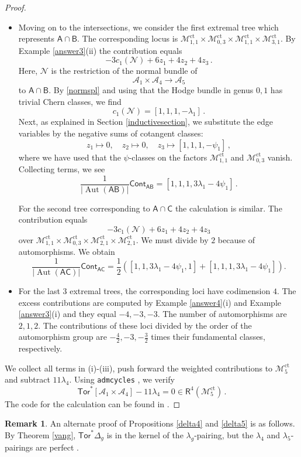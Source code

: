 \documentclass[11pt]{amsart}
\theoremstyle{definition}
\newtheorem{rem}[thm]{Remark}
\newcommand{\M}{\mathcal{M}}
\newcommand{\A}{\mathcal{A}}
\DeclareMathOperator{\ct}{ct}
\DeclareMathOperator{\Aut}{Aut}
\newcommand{\Tor}{\mathsf{Tor}}
\begin{document}
{\begin{proof}
\begin{itemize}
\item [(ii)] Moving on to the intersections, we consider the first extremal tree which represents $\mathsf A\cap \mathsf B$. The corresponding locus is $\M_{1, 1}^{\ct}\times \M_{0, 3}^{\ct}\times \M_{1, 1}^{\ct}\times \M_{3, 1}^{\ct}.$
By Example \ref{answer3}(ii) the contribution equals $$-3c_1(\mathcal N)+6z_1+4z_2+4z_3\,.$$ Here, $\mathcal N$ is the restriction of the normal bundle of $$\A_1\times \A_4\to \A_5$$ to $\mathsf A\cap \mathsf B.$ By \eqref{normspl} and using that the Hodge bundle in genus $0, 1$ has trivial Chern classes, we find $$c_1(\mathcal N)=[1, 1, 1, -\lambda_1]\, .$$ 
Next, as explained in Section \ref{inductivesection}, we substitute the edge variables by the negative sums of cotangent classes: $$z_1\mapsto 0, \quad z_2\mapsto 0, \quad z_3\mapsto [1, 1, 1, -\psi_1]\,,$$ where we have used that the $\psi$-classes on the factors $\M_{1, 1}^{\ct}$ and $\M_{0, 3}^{\ct}$ vanish.  
Collecting terms, we see $$\frac{1}{|\Aut(\mathsf{AB})|}\mathsf{Cont}_{\mathsf{AB}}=[1, 1, 1, 3\lambda_1-4\psi_1]\,.$$

For the second tree corresponding to $\mathsf A\cap \mathsf C$ the calculation is similar. The contribution  equals 
$$-3c_1(\mathcal N)+6z_1+4z_2+4z_3$$ over $\M_{1, 1}^{\ct}\times \M_{0, 3}^{\ct}\times \M_{2, 1}^{\ct}\times \M_{2, 1}^{\ct}.$ We must divide by $2$ because of automorphisms. We obtain  $$\frac{1}{|\Aut(\mathsf{AC})|}\mathsf{Cont}_{\mathsf A\mathsf C}=\frac{1}{2}\left([1, 1, 3\lambda_1-4\psi_1, 1 ]+[1, 1, 1, 3\lambda_1-4\psi_1]\right).$$

\item [(iii)] For the last $3$ extremal trees, the corresponding loci have codimension $4$. The excess contributions are computed  by Example \ref{answer4}(i) and Example \ref{answer3}(i) and they equal $-4, -3, -3$. The number of automorphisms are $2, 1, 2.$ The contributions of these loci divided by the order of the automorphism group are $-\frac{4}{2}, -3, -\frac{3}{2}$ times their fundamental classes, respectively. 
\end{itemize}
We collect all terms in (i)-(iii), push forward the weighted contributions to $\M_{5}^{\ct}$ and subtract $11\lambda_4$. Using \texttt{admcycles} \cite{admcycles}, we verify  
$$\Tor^*[\A_1\times \A_4]-11\lambda_4=0\in \mathsf{R}^4(\M_5^{\ct})\, .$$ The code for the calculation can be found in \cite {COP}. 
\end{proof}
\begin{rem}
    An alternate proof of Propositions \ref{delta4} and \ref{delta5} is as follows. By Theorem \ref{vang}, $\Tor^*\Delta_g$ is in the kernel of the $\lambda_g$-pairing, but the $\lambda_4$ and $\lambda_5$-pairings are perfect \cite{CLS}. 
\end{rem}

}
\end{document}
